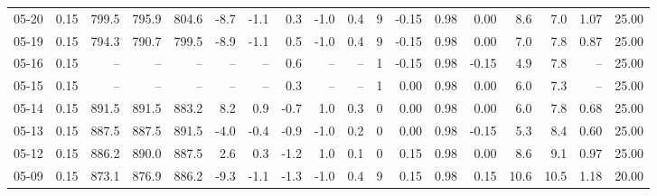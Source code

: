 \begin{threeparttable}
{\begin{tabular}{lrrrrrrrrrrrrrrrrr}
  05-20 &     0.15 & 799.5 & 795.9 & 804.6 &       -8.7 &           -1.1 &                       0.3 &                     -1.0 &                 0.4 &              9 &      -0.15 &      0.98 &           0.00 &              8.6 &                 7.0 &            1.07 &                  25.00 \\
  05-19 &     0.15 & 794.3 & 790.7 & 799.5 &       -8.9 &           -1.1 &                       0.5 &                     -1.0 &                 0.4 &              9 &      -0.15 &      0.98 &           0.00 &              7.0 &                 7.8 &            0.87 &                  25.00 \\
  05-16 &     0.15 &    -- &    -- &    -- &         -- &             -- &                       0.6 &                       -- &                  -- &              1 &      -0.15 &      0.98 &          -0.15 &              4.9 &                 7.8 &              -- &                  25.00 \\
  05-15 &     0.15 &    -- &    -- &    -- &         -- &             -- &                       0.3 &                       -- &                  -- &              1 &       0.00 &      0.98 &           0.00 &              6.0 &                 7.3 &              -- &                  25.00 \\
  05-14 &     0.15 & 891.5 & 891.5 & 883.2 &        8.2 &            0.9 &                      -0.7 &                      1.0 &                 0.3 &              0 &       0.00 &      0.98 &           0.00 &              6.0 &                 7.8 &            0.68 &                  25.00 \\
  05-13 &     0.15 & 887.5 & 887.5 & 891.5 &       -4.0 &           -0.4 &                      -0.9 &                     -1.0 &                 0.2 &              0 &       0.00 &      0.98 &          -0.15 &              5.3 &                 8.4 &            0.60 &                  25.00 \\
  05-12 &     0.15 & 886.2 & 890.0 & 887.5 &        2.6 &            0.3 &                      -1.2 &                      1.0 &                 0.1 &              0 &       0.15 &      0.98 &           0.00 &              8.6 &                 9.1 &            0.97 &                  25.00 \\
  05-09 &     0.15 & 873.1 & 876.9 & 886.2 &       -9.3 &           -1.1 &                      -1.3 &                     -1.0 &                 0.4 &              9 &       0.15 &      0.98 &           0.15 &             10.6 &                10.5 &            1.18 &                  20.00 \\

\end{tabular}}
\end{threeparttable}
